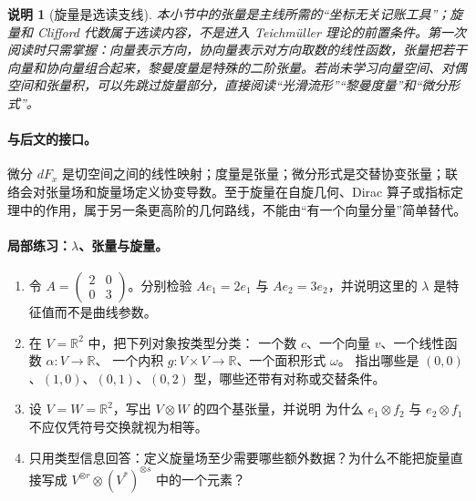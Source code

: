 \documentclass[UTF8,fontset=none,a4paper,11pt]{ctexart}
\theoremstyle{foundation-definition}
\theoremstyle{foundation-theorem}
\theoremstyle{foundation-proposition}
\theoremstyle{foundation-example}
\theoremstyle{foundation-remark}
\newtheorem{remark}[definition]{说明}
\theoremstyle{foundation-theorem}
\begin{document}
\begin{remark}[旋量是选读支线]
本小节中的张量是主线所需的“坐标无关记账工具”；旋量和 Clifford 代数属于选读内容，不是进入 Teichmüller 理论的前置条件。第一次阅读时只需掌握：向量表示方向，协向量表示对方向取数的线性函数，张量把若干向量和协向量组合起来，黎曼度量是特殊的二阶张量。若尚未学习向量空间、对偶空间和张量积，可以先跳过旋量部分，直接阅读“光滑流形”“黎曼度量”和“微分形式”。
\end{remark}

\paragraph{与后文的接口。}
微分 \(dF_x\) 是切空间之间的线性映射；度量是张量；微分形式是交替协变张量；联络会对张量场和旋量场定义协变导数。至于旋量在自旋几何、Dirac 算子或指标定理中的作用，属于另一条更高阶的几何路线，不能由“有一个向量分量”简单替代。

\paragraph{局部练习：\(\lambda\)、张量与旋量。}
\begin{enumerate}[label=M5C.\arabic*.]
  \item 令 \(A=\begin{pmatrix}2&0\\0&3\end{pmatrix}\)。分别检验
    \(Ae_1=2e_1\) 与 \(Ae_2=3e_2\)，并说明这里的 \(\lambda\) 是特征值而不是曲线参数。
  \item 在 \(V=\mathbb R^2\) 中，把下列对象按类型分类：
    一个数 \(c\)、一个向量 \(v\)、一个线性函数 \(\alpha:V\to\mathbb R\)、
    一个内积 \(g:V\times V\to\mathbb R\)、一个面积形式 \(\omega\)。
    指出哪些是 \((0,0)\)、\((1,0)\)、\((0,1)\)、\((0,2)\) 型，哪些还带有对称或交替条件。
  \item 设 \(V=W=\mathbb R^2\)，写出 \(V\otimes W\) 的四个基张量，并说明
    为什么 \(e_1\otimes f_2\) 与 \(e_2\otimes f_1\) 不应仅凭符号交换就视为相等。
  \item 只用类型信息回答：定义旋量场至少需要哪些额外数据？为什么不能把旋量直接写成
    \(V^{\otimes r}\otimes(V^*)^{\otimes s}\) 中的一个元素？
\end{enumerate}
\end{document}
